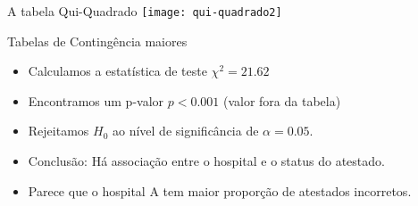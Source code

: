 \documentclass{beamer}
\begin{document}
\begin{frame}{A tabela Qui-Quadrado}
  \texttt{[image: qui-quadrado2]}
\end{frame}

\begin{frame}{Tabelas de Contingência maiores}
  \begin{itemize}
  \item Calculamos a estatística de teste $\chi^2 = 21.62$
  \item Encontramos um p-valor $p<0.001$ (valor fora da tabela)
  \item Rejeitamos $H_0$ ao nível de significância de $\alpha = 0.05$.
  \item Conclusão: Há associação entre o hospital e o status do atestado.
  \item Parece que o hospital A tem maior proporção de atestados incorretos.
  \end{itemize}
\end{frame}







\end{document}
